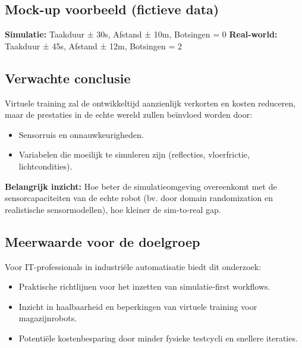 \subsection{Mock-up voorbeeld (fictieve data)}
\textbf{Simulatie:} Taakduur ± 30s, Afstand ± 10m, Botsingen = 0
\textbf{Real-world:} Taakduur ± 45s, Afstand ± 12m, Botsingen = 2

\subsection{Verwachte conclusie}
Virtuele training zal de ontwikkeltijd aanzienlijk verkorten en kosten reduceren, maar de prestaties in de echte wereld zullen beïnvloed worden door:
\begin{itemize}
    \item Sensorruis en onnauwkeurigheden.
    \item Variabelen die moeilijk te simuleren zijn (reflecties, vloerfrictie, lichtcondities).
\end{itemize}

\textbf{Belangrijk inzicht:} Hoe beter de simulatieomgeving overeenkomt met de sensorcapaciteiten van de echte robot (bv. door domain randomization en realistische sensormodellen), hoe kleiner de sim-to-real gap.

\subsection{Meerwaarde voor de doelgroep}
Voor IT-professionals in industriële automatisatie biedt dit onderzoek:
\begin{itemize}
    \item Praktische richtlijnen voor het inzetten van simulatie-first workflows.
    \item Inzicht in haalbaarheid en beperkingen van virtuele training voor magazijnrobots.
    \item Potentiële kostenbesparing door minder fysieke testcycli en snellere iteraties.
\end{itemize}
